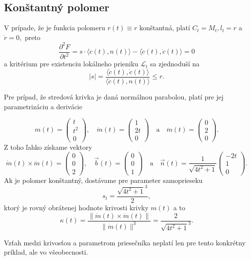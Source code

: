 \subsection{Konštantný polomer}
V prípade, že je funkcia polomeru $r(t) \equiv r $ konštantná, platí $C_t = M_t,  l_t = r$ a $\dot{r} = 0,$ preto 
$$\dfrac{\partial^2 F}{\partial t^2} = s \cdot \langle \ddot{c}(t), n(t) \rangle - \langle \dot{c}(t), \dot{c}(t) \rangle = 0$$
a kritérium pre existenciu lokálneho prieniku $\mathcal{L}_t$ sa zjednoduší na
$$
\lvert s \rvert = \frac{\langle \dot{c}(t), \dot{c}(t) \rangle}{\langle \ddot{c}(t), n(t) \rangle} \leq r.
$$
\begin{example}
Pre prípad, že stredová krivka je daná normálnou parabolou, platí pre jej parametrizáciu a derivácie

\[
m(t) = \begin{pmatrix} t \\ t^2 \\ 0 \end{pmatrix}, \quad \dot{m}(t) = \begin{pmatrix} 1 \\ 2t \\ 0 \end{pmatrix} \quad \text{a} \quad \ddot{m}(t) = \begin{pmatrix} 0 \\ 2 \\ 0 \end{pmatrix}.
\]
Z toho ľahko získame vektory 
$$ \dot{m}(t) \times \ddot{m}(t) =
\begin{pmatrix} 0 \\ 0 \\ 2 \end{pmatrix} , \quad \vec{b}(t) = \begin{pmatrix} 0 \\ 0 \\ 1 \end{pmatrix} \quad  \text{a} \quad \vec{n}(t) = \dfrac{1}{\sqrt{4t^2 + 1}} \begin{pmatrix} -2t \\ 1 \\ 0 \end{pmatrix}.$$
Ak je polomer konštantný, dostávame pre parameter samoprieseku
$$ s_t = \dfrac{\sqrt{4t^2 + 1}^3}{2}, $$
ktorý je rovný obrátenej hodnote krivosti krivky $m(t)$ a to
$$ \kappa(t) = \frac{\lVert  \dot{m}(t) \times \ddot{m}(t) \rVert}{\lVert \dot{m}(t) \rVert^3} = \frac{2}{\sqrt{4t^2 + 1}^3}. $$
\end{example}
Vzťah medzi krivosťou a parametrom priesečníka neplatí len pre tento konkrétny príklad, ale vo všeobecnosti.

